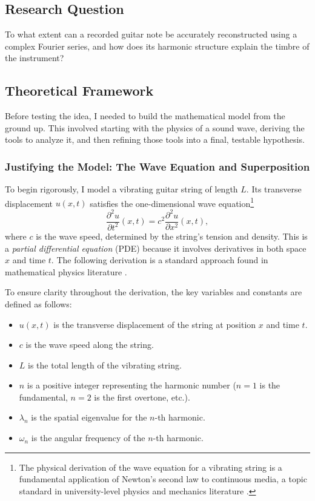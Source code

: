 \documentclass{article}
\begin{document}
\subsection{Research Question}
To what extent can a recorded guitar note be accurately reconstructed using a complex Fourier series, and how does its harmonic structure explain the timbre of the instrument?

\subsection{Theoretical Framework}
Before testing the idea, I needed to build the mathematical model from the ground up. This involved starting with the physics of a sound wave, deriving the tools to analyze it, and then refining those tools into a final, testable hypothesis.

    \subsubsection{Justifying the Model: The Wave Equation and Superposition}

To begin rigorously, I model a vibrating guitar string of length $L$. Its transverse displacement $u(x,t)$ 
satisfies the one-dimensional wave equation\footnote{The physical derivation of the wave equation for a vibrating string is a fundamental application of Newton's second law to continuous media, a topic standard in university-level physics and mechanics literature \cite{halliday_resnick}.}
\begin{equation}
    \frac{\partial^2 u}{\partial t^2}(x,t) = c^2 \frac{\partial^2 u}{\partial x^2}(x,t), 
    \label{eq:wave}
\end{equation}
where $c$ is the wave speed, determined by the string’s tension and density. This is a \emph{partial differential equation} (PDE) because it involves derivatives in both space $x$ and time $t$. The following derivation is a standard approach found in mathematical physics literature \cite{stein2003fourier}.

To ensure clarity throughout the derivation, the key variables and constants are defined as follows:
\begin{itemize}
    \item $u(x,t)$ is the transverse displacement of the string at position $x$ and time $t$.
    \item $c$ is the wave speed along the string.
    \item $L$ is the total length of the vibrating string.
    \item $n$ is a positive integer representing the harmonic number ($n=1$ is the fundamental, $n=2$ is the first overtone, etc.).
    \item $\lambda_n$ is the spatial eigenvalue for the $n$-th harmonic.
    \item $\omega_n$ is the angular frequency of the $n$-th harmonic.
\end{itemize}
\end{document}
